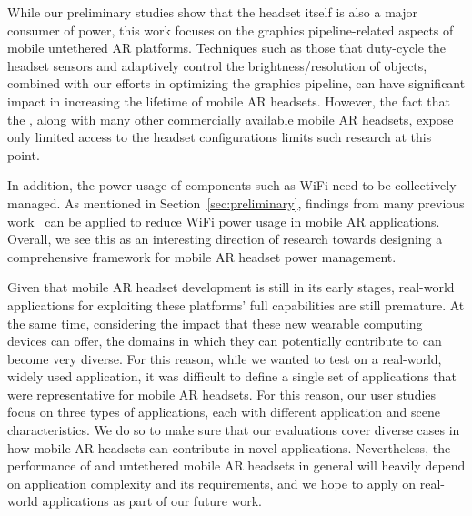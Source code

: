 %
While our preliminary studies show that the headset itself is also a major consumer of power, this work focuses on the graphics pipeline-related aspects of mobile untethered AR platforms. Techniques such as those that duty-cycle the headset sensors and adaptively control the brightness/resolution of objects, combined with our efforts in optimizing the graphics pipeline, can have significant impact in increasing the lifetime of mobile AR headsets. However, the fact that the {\mlo}, along with many other commercially available mobile AR headsets, expose only limited access to the headset configurations limits such research at this point. 

In addition, the power usage of components such as WiFi need to be collectively managed. As mentioned in Section~\ref{sec:preliminary}, findings from many previous work~\cite{Qian2018, Qian2018TVP, Abari2017} can be applied to reduce WiFi power usage in mobile AR applications. Overall, we see this as an interesting direction of research towards designing a comprehensive framework for mobile AR headset power management. 


%
Given that mobile AR headset development is still in its early stages, real-world applications for exploiting these platforms' full capabilities are still premature. At the same time, considering the impact that these new wearable computing devices can offer, the domains in which they can potentially contribute to can become very diverse. For this reason, while we wanted to test {\myit} on a real-world, widely used application, it was difficult to define a single set of applications that were representative for mobile AR headsets. For this reason, our user studies focus on three types of applications, each with different application and scene characteristics. We do so to make sure that our evaluations cover diverse cases in how mobile AR headsets can contribute in novel applications. Nevertheless, the performance of {\myit} and untethered mobile AR headsets in general will heavily depend on application complexity and its requirements, and we hope to apply {\myit} on real-world applications as part of our future work.

%

